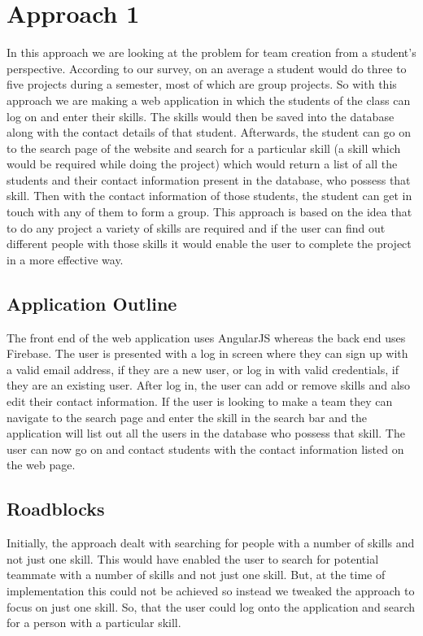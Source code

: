 \documentclass[conference]{IEEEtran}
\begin{document}
\section{Approach 1}
In this approach we are looking at the problem for team creation from a student's perspective. According to our survey, on an average a student would do three to five projects during a semester, most of which are group projects. So with this approach we are making a web application in which the students of the class can log on and enter their skills. The skills would then be saved into the database along with the contact details of that student. Afterwards, the student can go on to the search page of the website and search for a particular skill (a skill which would be required while doing the project) which would return a list of all the students and their contact information present in the database, who possess that skill. Then with the contact information of those students, the student can get in touch with any of them to form a group. This approach is based on the idea that to do any project a variety of skills are required and if the user can find out different people with those skills it would enable the user to complete the project in a more effective way.

\subsection{Application Outline}
The front end of the web application uses AngularJS whereas the back end uses Firebase. The user is presented with a log in screen where they can sign up with a valid email address, if they are a new user, or log in with valid credentials, if they are an existing user. After log in, the user can add or remove skills and also edit their contact information. If the user is looking to make a team they can navigate to the search page and enter the skill in the search bar and the application will list out all the users in the database who possess that skill. The user can now go on and contact students with the contact information listed on the web page.

\subsection{Roadblocks}
Initially, the approach dealt with searching for people with a number of skills and not just one skill. This would have enabled the user to search for potential teammate with a number of skills and not just one skill. But, at the time of implementation this could not be achieved so instead we tweaked the approach to focus on just one skill. So, that the user could log onto the application and search for a person with a particular skill.
\end{document}
